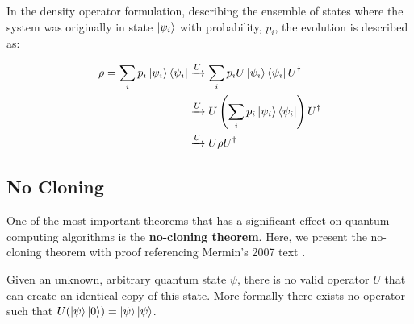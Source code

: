 In the density operator formulation, describing the ensemble of states where the system was originally in state $\ket{\psi_i}$ with probability, $p_i$, the evolution is described as:

\begin{align*}
    \rho = \sum_i p_i \ket{\psi_i}\bra{\psi_i} &\xrightarrow{U} \sum_i p_i U\ket{\psi_i}\bra{\psi_i}U^{\dagger} \\
    &\xrightarrow{U} U \left(\sum_i p_i \ket{\psi_i}\bra{\psi_i} \right)U^{\dagger} \\
    &\xrightarrow{U} U \rho U^{\dagger} \\
\end{align*}

\subsection{No Cloning}

One of the most important theorems that has a significant effect on quantum computing algorithms is the \textbf{no-cloning theorem}. Here, we present the no-cloning theorem with proof referencing Mermin's 2007 text \cite{merlin}.

\begin{noclonetheorem}{}
    \label{thm:no-cloning-thm}
    Given an unknown, arbitrary quantum state $\psi$, there is no valid operator $U$ that can create an identical copy of this state. More formally there exists no operator such that $U(\ket{\psi} \ket{0}) = \ket{\psi}\ket{\psi}$.
\end{noclonetheorem}

